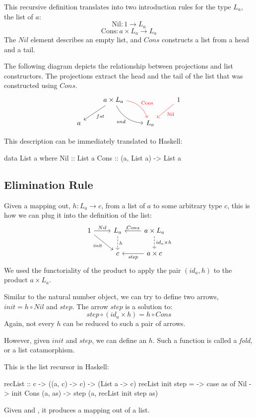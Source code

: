 \documentclass[DaoFP]{subfiles}
\begin{document}
This recursive definition translates into two introduction rules for the type $L_a$, the list of $a$: 
\[ \text{Nil} \colon 1 \to L_a \]
\[ \text{Cons} \colon a \times L_a \to L_a \]
The $Nil$ element describes an empty list, and $Cons$ constructs a list from a head and a tail. 

The following diagram depicts the relationship between projections and list constructors. The projections extract the head and the tail of the list that was constructed using $Cons$.
\[
 \begin{tikzcd}
 & a \times L_a
 \arrow[ld, "fst"]
 \arrow[rd, bend right, "snd"']
 \arrow[rd, bend left, red, "\text{Cons}"]
 && 1
 \arrow[ld, red, "\text{Nil}"]
 \\
 a
&&L_a
  \end{tikzcd}
\]

This description can be immediately translated to Haskell:
\begin{haskell}
data List a where
  Nil  :: List a
  Cons :: (a, List a) -> List a
\end{haskell}



\subsection{Elimination Rule}

Given a mapping out, $h \colon L_a \to c$, from a list of $a$ to some arbitrary type $c$, this is how we can plug it into the definition of the list:
\[
 \begin{tikzcd}
 1
 \arrow[r, "Nil"]
 \arrow[rd, "\mathit{init}"']
 &L_a
\arrow[d, dashed, "h"]
&a \times L_a
  \arrow[l, "Cons"']
\arrow[d, dashed, "id_a \times h"]
\\
& c
& a \times c
\arrow[l, "\mathit{step}"]
  \end{tikzcd}
\]
We used the functoriality of the product to apply the pair $(id_a, h)$ to the product $a \times L_a$.

Similar to the natural number object, we can try to define two arrows, $\mathit{init} = h \circ Nil$ and $\mathit{step}$. The arrow $\mathit{step}$ is a solution to:
\[ \mathit{step} \circ (id_a \times h) = h \circ Cons \]
Again, not every $h$ can be reduced to such a pair of arrows.

However, given $\mathit{init}$ and $\mathit{step}$, we can define an $h$. Such a function is called a \emph{fold}, or a list catamorphism. 

This is the list recursor in Haskell:
\begin{haskell}
recList :: c -> ((a, c) -> c) -> (List a -> c)
recList init step = \as ->
  case as of 
    Nil          -> init
    Cons (a, as) -> step (a, recList init step as)
\end{haskell}
Given  and , it produces a mapping out of a list.
\end{document}
